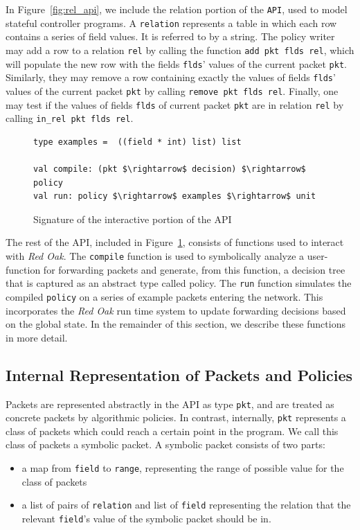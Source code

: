 \documentclass[preprint]{sigplanconf}
\begin{document}
In Figure~\ref{fig:rel_api}, we include the relation portion of the \lstinline|API|, used to model stateful controller programs. A \lstinline|relation| represents a table in which each row contains a series of field values. It is referred to by a string. The policy writer may add a row to a relation \lstinline|rel| by calling the function \lstinline|add pkt flds rel|, which will populate the new row with the fields \lstinline|flds|' values of the current packet \lstinline|pkt|. Similarly, they may remove a row containing exactly the values of fields \lstinline|flds|' values of the current packet \lstinline|pkt| by calling \lstinline|remove pkt flds rel|. Finally, one may test if the values of fields \lstinline|flds| of current packet \lstinline|pkt| are in relation \lstinline|rel| by calling \lstinline|in_rel pkt flds rel|.


\begin{figure}[ht]
  \begin{lstlisting}[mathescape]
type examples =  ((field * int) list) list
  
val compile: (pkt $\rightarrow$ decision) $\rightarrow$ policy
val run: policy $\rightarrow$ examples $\rightarrow$ unit
  \end{lstlisting}

  \caption{Signature of the interactive portion of the API}
  \label{fig:build_api}
\end{figure}


The rest of the API, included in Figure~\ref{fig:build_api}, consists of functions used to interact with \textit{Red Oak}. The \lstinline|compile| function is used to symbolically analyze a user-function for forwarding packets and generate, from this function, a decision tree that is captured as an abstract type called policy. The \lstinline|run| function simulates the compiled \lstinline|policy| on a series of example packets entering the network. This incorporates the \textit{Red Oak} run time system to update forwarding decisions based on the global state. In the remainder of this section, we describe these functions in more detail.

\subsection*{Internal Representation of Packets and Policies}

Packets are represented abstractly in the API as type \lstinline|pkt|, and are treated as concrete packets by algorithmic policies. In contrast, internally, \lstinline|pkt| represents a class of packets which could reach a certain point in the program. We call this class of packets a symbolic packet.
A symbolic packet consists of two parts:
\begin{itemize}
\item a map from \lstinline|field| to \lstinline|range|, representing the range of possible value for the class of packets
  \item a list of pairs of \lstinline|relation| and list of \lstinline|field| representing the relation that the relevant \lstinline|field|'s value of the symbolic packet should be in. 
  \end{itemize}
  
\end{document}
